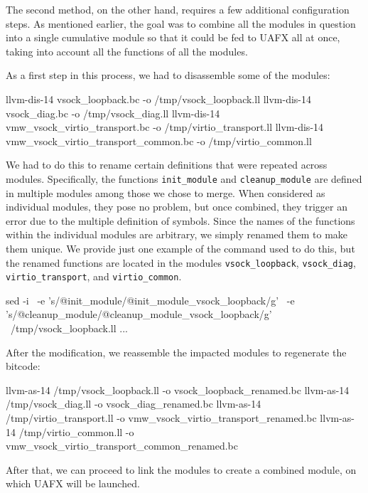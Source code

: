 The second method, on the other hand, requires a few additional configuration steps. As mentioned earlier, the goal was to combine all the modules in question into a single cumulative module so that it could be fed to UAFX all at once, taking into account all the functions of all the modules.

\noindent As a first step in this process, we had to disassemble some of the modules:

\begin{bashlncode}
llvm-dis-14 
    vsock_loopback.bc
    -o /tmp/vsock_loopback.ll
llvm-dis-14
    vsock_diag.bc
    -o /tmp/vsock_diag.ll
llvm-dis-14
    vmw_vsock_virtio_transport.bc
    -o /tmp/virtio_transport.ll
llvm-dis-14
    vmw_vsock_virtio_transport_common.bc
    -o /tmp/virtio_common.ll
\end{bashlncode}

\noindent We had to do this to rename certain definitions that were repeated across modules. Specifically, the functions \texttt{init\_module} and \texttt{cleanup\_module} are defined in multiple modules among those we chose to merge. When considered as individual modules, they pose no problem, but once combined, they trigger an error due to the multiple definition of symbols. Since the names of the functions within the individual modules are arbitrary, we simply renamed them to make them unique. We provide just one example of the command used to do this, but the renamed functions are located in the modules \texttt{vsock\_loopback}, \texttt{vsock\_diag}, \texttt{virtio\_transport}, and \texttt{virtio\_common}.

\begin{bashlncode}
sed -i \
  -e 's/@init_module/@init_module_vsock_loopback/g' \
  -e 's/@cleanup_module/@cleanup_module_vsock_loopback/g' \
  /tmp/vsock_loopback.ll
...
\end{bashlncode}

\noindent After the modification, we reassemble the impacted modules to regenerate the bitcode:

\begin{bashlncode}
llvm-as-14
    /tmp/vsock_loopback.ll
    -o vsock_loopback_renamed.bc
llvm-as-14
    /tmp/vsock_diag.ll
    -o vsock_diag_renamed.bc
llvm-as-14
    /tmp/virtio_transport.ll
    -o vmw_vsock_virtio_transport_renamed.bc
llvm-as-14
    /tmp/virtio_common.ll
    -o vmw_vsock_virtio_transport_common_renamed.bc
\end{bashlncode}

\noindent After that, we can proceed to link the modules to create a combined module, on which UAFX will be launched.

